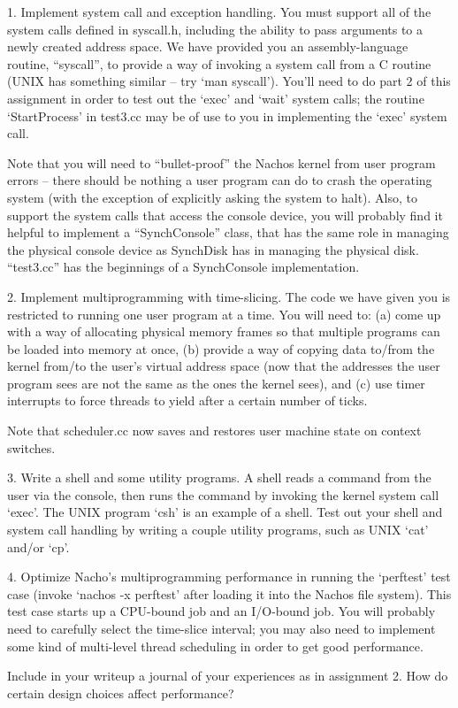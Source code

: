 \begin{description}
\item{1.}
Implement system call and exception handling.  You must
support all of the system calls defined in syscall.h, including
the ability to pass arguments to a newly created address space.
We have provided you an assembly-language routine, ``syscall'', to
provide a way of invoking a system call from a C routine (UNIX has
something similar -- try `man syscall').   You'll need to do part 2 of 
this assignment in order to test out the `exec' and `wait' system calls;
the routine `StartProcess' in test3.cc may be of use to you in
implementing the `exec' system call.

Note that you will need to ``bullet-proof'' the Nachos kernel from
user program errors -- there should be nothing a user program can
do to crash the operating system (with the exception of explicitly asking 
the system to halt).  Also, to support the system calls that access 
the console device, you will probably find it helpful to implement 
a ``SynchConsole'' class, that has the same role in managing the physical 
console device as SynchDisk has in managing the physical disk.
``test3.cc'' has the beginnings of a SynchConsole implementation.

\item{2.}
Implement multiprogramming with time-slicing.  The code we have given
you is restricted to running one user program at a time.
You will need to: (a) come up with a way of allocating physical memory 
frames so that multiple programs can be loaded into memory at once, 
(b) provide a way of copying data to/from the kernel from/to the user's 
virtual address space (now that the addresses the user program sees
are not the same as the ones the kernel sees), and (c) use timer interrupts 
to force threads to yield after a certain number of ticks.

Note that scheduler.cc now saves and restores user machine state
on context switches.

\item{3.}
Write a shell and some utility programs.  A shell reads a command 
from the user via the console, then runs the command by invoking
the kernel system call `exec'.
The UNIX program `csh' is an example of a shell.  
Test out your shell and system call handling by writing a couple 
utility programs, such as UNIX `cat' and/or `cp'.

\item{4.}
Optimize Nacho's multiprogramming performance in running the `perftest'
test case (invoke `nachos -x perftest' after loading it into the Nachos 
file system).  This test case starts up a CPU-bound job and an I/O-bound job.
You will probably need to carefully select the time-slice interval;
you may also need to implement some kind of multi-level thread 
scheduling in order to get good performance.

Include in your writeup a journal of your experiences as in assignment 2.
How do certain design choices affect performance?

\end{description}

